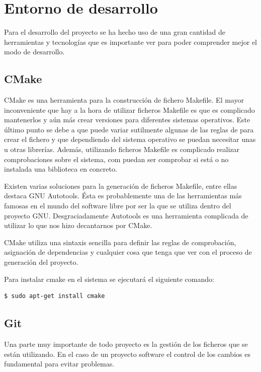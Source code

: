 \chapter{Entorno de desarrollo}

Para el desarrollo del proyecto se ha hecho uso de una gran cantidad de herramientas y tecnologías que es importante ver para poder comprender mejor el modo de desarrollo.

\section{CMake}

CMake es una herramienta para la construcción de fichero Makefile. El mayor inconveniente que hay a la hora de utilizar ficheros Makefile es que es complicado mantenerlos y aún más crear versiones para diferentes sistemas operativos. Este último punto se debe a que puede variar sutilmente algunas de las reglas de para crear el fichero y que dependiendo del sistema operativo se puedan necesitar unas u otras librerías. Además, utilizando ficheros Makefile es complicado realizar comprobaciones sobre el sistema, com puedan ser comprobar si está o no instalada una biblioteca en concreto.

Existen varias soluciones para la generación de ficheros Makefile, entre ellas destaca GNU Autotools. Ésta es probablemente una de las herramientas más famosas en el mundo del software libre por ser la que se utiliza dentro del proyecto GNU. Desgraciadamente Autotools es una herramienta complicada de utilizar lo que nos hizo decantarnos por CMake.

CMake utiliza una sintaxis sencilla para definir las reglas de comprobación, asignación de dependencias y cualquier cosa que tenga que ver con el proceso de generación del proyecto.

Para instalar cmake en el sistema se ejecutará el siguiente comando:

\begin{verbatim}
$ sudo apt-get install cmake
\end{verbatim}

\section{Git}

Una parte muy importante de todo proyecto es la gestión de los ficheros que se están utilizando. En el caso de un proyecto software el control de los cambios es fundamental para evitar problemas.

